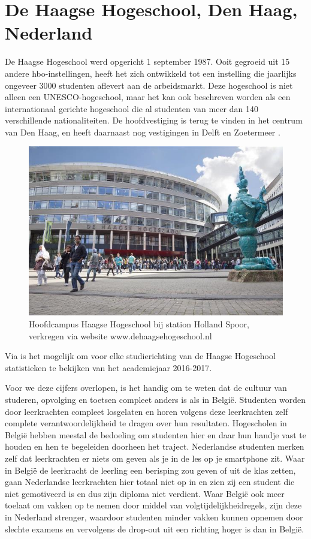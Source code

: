 \section{De Haagse Hogeschool, Den Haag, Nederland}
\label{sec:haagsehogeschool}

De Haagse Hogeschool werd opgericht 1 september 1987. Ooit gegroeid uit 15 andere hbo-instellingen, heeft het zich ontwikkeld tot een instelling die jaarlijks ongeveer 3000 studenten aflevert aan de arbeidsmarkt. Deze hogeschool is niet alleen een UNESCO-hogeschool, maar het kan ook beschreven worden als een internationaal gerichte hogeschool die al studenten van meer dan 140 verschillende nationaliteiten. De hoofdvestiging is terug te vinden in het centrum van Den Haag, en heeft daarnaast nog vestigingen in Delft en Zoetermeer \autocite{HaagseHogeschool2017}. 

\begin{figure}[!h]
	\includegraphics[width=\textwidth]
	{img/haagse_hogeschool.jpg}
	\caption{Hoofdcampus Haagse Hogeschool bij station Holland Spoor, verkregen via website www.dehaagsehogeschool.nl}
	\label{fig:haagsehogeschool}
\end{figure}

Via \textcite{Studiekeuze2017} is het mogelijk om voor elke studierichting van de Haagse Hogeschool statistieken te bekijken van het academiejaar 2016-2017. 

Voor we deze cijfers overlopen, is het handig om te weten dat de cultuur van studeren, opvolging en toetsen compleet anders is als in België. Studenten worden door leerkrachten compleet losgelaten en horen volgens deze leerkrachten zelf complete verantwoordelijkheid te dragen over hun resultaten. Hogescholen in België hebben meestal de bedoeling om studenten hier en daar hun handje vast te houden en hen te begeleiden doorheen het traject. Nederlandse studenten merken zelf dat leerkrachten er niets om geven als je in de les op je smartphone zit. Waar in België de leerkracht de leerling een berisping zou geven of uit de klas zetten, gaan Nederlandse leerkrachten hier totaal niet op in en zien zij een student die niet gemotiveerd is en dus zijn diploma niet verdient. Waar België ook meer toelaat om vakken op te nemen door middel van volgtijdelijkheidregels, zijn deze in Nederland strenger, waardoor studenten minder vakken kunnen opnemen door slechte examens en vervolgens de drop-out uit een richting hoger is dan in België.

